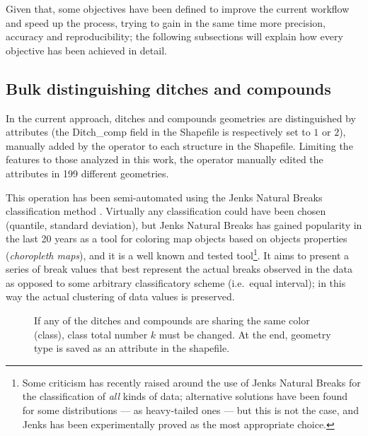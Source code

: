         Given that, some objectives have been defined to improve the current workflow and speed up the process, trying to gain in the same time more precision, accuracy and reproducibility; the following subsections will explain how every objective has been achieved in detail.

        \subsection{Bulk distinguishing ditches and compounds\label{sec:distinguish}}
            In the current approach, ditches and compounds geometries are distinguished by attributes (the \textsf{Ditch\_comp} field in the Shapefile is respectively set to $1$ or $2$), manually added by the operator to each structure in the Shapefile. Limiting the features to those analyzed in this work, the operator manually edited the attributes in 199 different geometries.

            This operation has been semi-automated using the Jenks Natural Breaks classification method \cite{jenks1977}. Virtually any classification could have been chosen (quantile, standard deviation), but Jenks Natural Breaks has gained popularity in the last 20 years as a tool for coloring map objects based on objects properties (\emph{choropleth maps}), and it is a well known and tested tool\footnote{Some criticism has recently raised around the use of Jenks Natural Breaks for the classification of \emph{all} kinds of data; alternative solutions have been found for some distributions --- as heavy-tailed ones \cite{jenks-tail} --- but this is not the case, and Jenks has been experimentally proved as the most appropriate choice.}. It aims to present a series of break values that best represent the actual breaks observed in the data as opposed to some arbitrary classificatory scheme (i.e.\ equal interval); in this way the actual clustering of data values is preserved.

            \begin{wrapfigure}{l}{0.5\textwidth}
                \centering
                \vspace{-0.03\textheight}
                \begin{tikzpicture}[x=1mm,y=1mm,scale=0.005]
                    
                \end{tikzpicture}
                \caption[Flow chart: the logic of bulk distinguishing ditches and compounds]{If any of the ditches and compounds are sharing the same color (class), class total number $k$ must be changed. At the end, geometry type is saved as an attribute in the shapefile.}
                \label{fig:flow-map}
                \vspace{-0.03\textheight}
            \end{wrapfigure}

